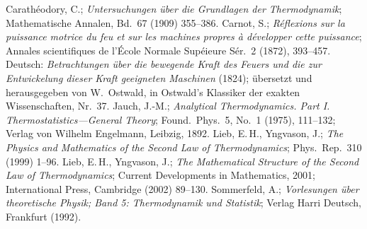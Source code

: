 \begin{thebibliography}{99}
 Carath\'{e}odory, C.; \textit{Untersuchungen \"uber die Grundlagen der
          Thermodynamik}; Mathematische Annalen, Bd.\ 67 (1909) 355--386.
 Carnot, S.; \textit{R\'{e}flexions sur la puissance motrice du feu et sur les machines propres \`{a} d\'{e}velopper cette
               puissance}; Annales scientifiques de l'\'{E}cole Normale Sup\'{e}ieure S\'{e}r.\ 2 (1872), 393--457.\\Deutsch:
               \textit{Betrachtungen \"uber die bewegende Kraft des Feuers und die zur Entwickelung dieser Kraft geeigneten Maschinen} (1824);
               \"ubersetzt und herausgegeben von W.\ Ostwald, in Ostwald's Klassiker der exakten Wissenschaften, Nr.\ 37.        
 Jauch, J.-M.; \textit{Analytical Thermodynamics. Part I. Thermostatistics---General Theory};
               Found.\ Phys.\ 5, No.\ 1 (1975), 111--132; Verlag von Wilhelm Engelmann, Leibzig, 1892.
 Lieb, E.\,H., Yngvason, J.; \textit{The Physics and Mathematics of the Second Law of
            Thermodynamics}; Phys.\ Rep.\ 310 (1999) 1--96.
 Lieb, E.\,H., Yngvason, J.; \textit{The Mathematical Structure of the Second Law of
            Thermodynamics}; Current Developments in Mathematics, 2001; International Press, Cambridge (2002)
            89--130.
 Sommerfeld, A.; \textit{Vorlesungen \"uber theoretische Physik; Band 5: Thermodynamik und
             Statistik}; Verlag Harri Deutsch, Frankfurt (1992).                                                                           
\end{thebibliography}


%

